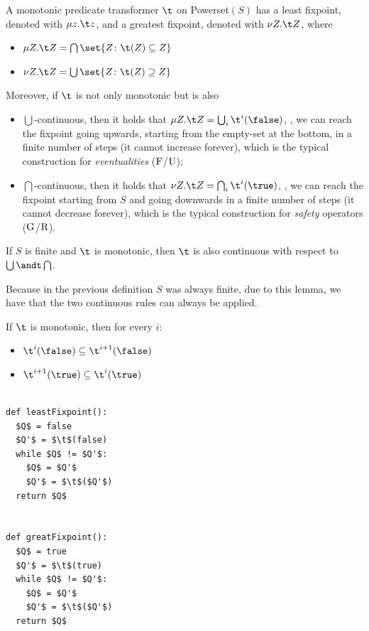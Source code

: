 \documentclass[oneside]{academica}
\begin{document}
\begin{definition*}[Tarski]
  A monotonic predicate transformer $\t$ on Powerset$(S)$ has a least fixpoint, denoted with $\mu z . \t z$, and a greatest fixpoint, denoted with $\nu Z . \t Z$, where
  \begin{itemize}
    \item $\mu Z . \t Z = \bigcap \set{Z \colon \t(Z) \subseteq Z}$
    \item $\nu Z . \t Z = \bigcup \set{Z \colon \t(Z) \supseteq Z}$
  \end{itemize}

  Moreover, if $\t$ is not only monotonic but is also
  \begin{itemize}
    \item $\bigcup$-continuous, then it holds that $\mu Z . \t Z = \bigcup_i \t^i(\false)$, \ie, we can reach the fixpoint going upwards, starting from the empty-set at the bottom, in a finite number of steps (it cannot increase forever), which is the typical construction for \emph{eventualities} ($\mathrm{F}$/$\mathrm{U}$);
    \item $\bigcap$-continuous, then it holds that $\nu Z . \t Z = \bigcap_i \t^i(\true)$, \ie, we can reach the fixpoint starting from $S$ and going downwards in a finite number of steps (it cannot decrease forever), which is the typical construction for \emph{safety} operators ($\mathrm{G}$/$\mathrm{R}$).
  \end{itemize}
\end{definition*}

\begin{lemma*}
  If $S$ is finite and $\t$ is monotonic, then $\t$ is also continuous with respect to $\bigcup \andt \bigcap$.
\end{lemma*}

Because in the previous definition $S$ was always finite, due to this lemma, we have that the two continuous rules can always be applied.

\begin{lemma*}
  If $\t$ is monotonic, then for every $i$:
  \begin{itemize}
    \item $\t^i (\false) \subseteq \t^{i+1} (\false)$
    \item $\t^{i+1} (\true) \subseteq \t^i (\true)$
  \end{itemize}
\end{lemma*}

\begin{lstlisting}[title={Least/Greatest Fixpoints}]

def leastFixpoint():
  $Q$ = false
  $Q'$ = $\t$(false)
  while $Q$ != $Q'$:
    $Q$ = $Q'$
    $Q'$ = $\t$($Q'$)
  return $Q$


def greatFixpoint():
  $Q$ = true
  $Q'$ = $\t$(true)
  while $Q$ != $Q'$:
    $Q$ = $Q'$
    $Q'$ = $\t$($Q'$)
  return $Q$
\end{lstlisting}
\end{document}

